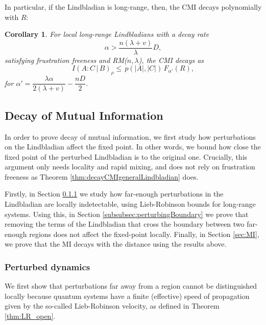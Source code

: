\documentclass[11pt]{article}
\numberwithin{equation}{section}
\numberwithin{figure}{section}
\numberwithin{table}{section}
\theoremstyle{definition}
\theoremstyle{plain}
\newtheorem{cor}[thm]{Corollary}
\theoremstyle{remark}
\newcommand{\abs}[1]{\left \vert#1\right\vert}
\begin{document}
In particular, if the Lindbladian is long-range, then, the CMI decays polynomially with $R$:
\medskip
\begin{cor}\label{cor:decayCMILongRange}
For local long-range Lindbladians with a decay rate\[\alpha > \dfrac{n(\lambda+v)}{\lambda}D,\]satisfying frustration freeness and RM($n,\lambda$), the CMI decays as
\begin{equation}
    I(A : C \,|\, B)_\rho \le \, p(\abs{A},\abs{C})\, F_{\alpha'}(R) ,
\end{equation}
for $\alpha'=\dfrac{\lambda \alpha}{2(\lambda +v)}-\dfrac{nD}{2}$.
\end{cor}



\subsection{Decay of Mutual Information}

In order to prove decay of mutual information, we first study how perturbations on the Lindbladian affect the fixed point. In other words, we bound how close the fixed point of the perturbed Lindbladian is to the original one. Crucially, this argument only needs locality and rapid mixing, and does not rely on frustration freeness as Theorem \ref{thm:decayCMIgeneralLindbladian} does. 

Firstly, in Section \ref{subsubsec:perturbedDynamics} we study how far-enough perturbations in the Lindbladian are locally indetectable, using Lieb-Robinson bounds for long-range systems. Using this, in Section \ref{subsubsec:perturbingBoundary} we prove that removing the terms of the Lindbladian that cross the boundary between two far-enough regions does not affect the fixed-point locally. Finally, in Section \ref{sec:MI}, we prove that the MI decays with the distance using the results above.


\subsubsection{Perturbed dynamics}\label{subsubsec:perturbedDynamics}

We first show that perturbations far away from a region cannot be distinguished locally because quantum systems have a finite (effective) speed of propagation given by the so-called Lieb-Robinson velocity, as defined in Theorem \ref{thm:LR_open}.
\end{document}
